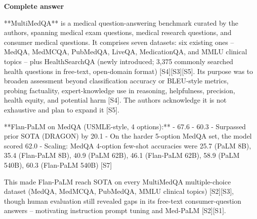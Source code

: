 \documentclass[10pt]{article}
\begin{document}
\textbf{Complete answer}
\begin{AnswerText}
**MultiMedQA** is a medical question-answering benchmark curated by the authors, spanning medical exam questions, medical research questions, and consumer medical questions. It comprises seven datasets: six existing ones -- MedQA, MedMCQA, PubMedQA, LiveQA, MedicationQA, and MMLU clinical topics -- plus HealthSearchQA (newly introduced; 3,375 commonly searched health questions in free-text, open-domain format) [S4][S3][S5]. Its purpose was to broaden assessment beyond classification accuracy or BLEU-style metrics, probing factuality, expert-knowledge use in reasoning, helpfulness, precision, health equity, and potential harm [S4]. The authors acknowledge it is not exhaustive and plan to expand it [S5].

**Flan-PaLM on MedQA (USMLE-style, 4 options):**
- 67.6%
- 60.3%
- Surpassed prior SOTA (DRAGON) by 20.1%
- On the harder 5-option MedQA set, the model scored 62.0%
- Scaling: MedQA 4-option few-shot accuracies were 25.7 (PaLM 8B), 35.4 (Flan-PaLM 8B), 40.9 (PaLM 62B), 46.1 (Flan-PaLM 62B), 58.9 (PaLM 540B), 60.3 (Flan-PaLM 540B) [S7]

This made Flan-PaLM reach SOTA on every MultiMedQA multiple-choice dataset (MedQA, MedMCQA, PubMedQA, MMLU clinical topics) [S2][S3], though human evaluation still revealed gaps in its free-text consumer-question answers -- motivating instruction prompt tuning and Med-PaLM [S2][S1].
\end{AnswerText}
\end{document}
